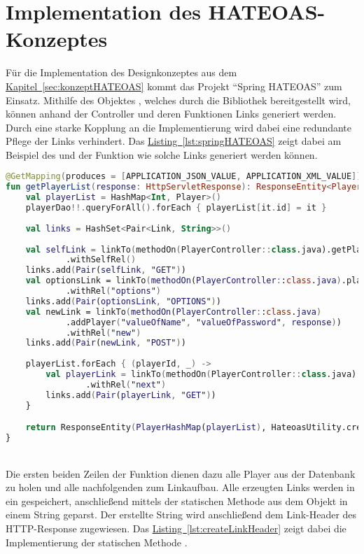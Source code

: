 \section{Implementation des HATEOAS-Konzeptes}
Für die Implementation des Designkonzeptes aus dem \hyperref[sec:konzeptHATEOAS]{Kapitel~\ref{sec:konzeptHATEOAS}} kommt das Projekt \enquote{Spring HATEOAS} zum Einsatz. Mithilfe des Objektes , welches durch die Bibliothek bereitgestellt wird, können anhand der Controller und deren Funktionen Links generiert werden. Durch eine starke Kopplung an die Implementierung wird dabei eine redundante Pflege der Links verhindert. Das \hyperref[lst:springHATEOAS]{Listing~\ref{lst:springHATEOAS}} zeigt dabei am Beispiel des  und der Funktion  wie solche Links generiert werden können.\\
\begin{lstlisting}[style=lstStyleFramed, language=Kotlin, caption={Linkaufbau mithilfe des Projektes \enquote{Spring HATEOAS}}, label=lst:springHATEOAS, float]
@GetMapping(produces = [APPLICATION_JSON_VALUE, APPLICATION_XML_VALUE])
fun getPlayerList(response: HttpServletResponse): ResponseEntity<PlayerHashMap> {
	val playerList = HashMap<Int, Player>()
	playerDao!!.queryForAll().forEach { playerList[it.id] = it }
	
	val links = HashSet<Pair<Link, String>>()
	
	val selfLink = linkTo(methodOn(PlayerController::class.java).getPlayerList(response))
			.withSelfRel()
	links.add(Pair(selfLink, "GET"))
	val optionsLink = linkTo(methodOn(PlayerController::class.java).playerOptions(response))
			.withRel("options")
	links.add(Pair(optionsLink, "OPTIONS"))
	val newLink = linkTo(methodOn(PlayerController::class.java)
			.addPlayer("valueOfName", "valueOfPassword", response))
			.withRel("new")
	links.add(Pair(newLink, "POST"))
	
	playerList.forEach { (playerId, _) ->
		val playerLink = linkTo(methodOn(PlayerController::class.java).getPlayerById(playerId, response))
				.withRel("next")
		links.add(Pair(playerLink, "GET"))
	}

	return ResponseEntity(PlayerHashMap(playerList), HateoasUtility.createLinkHeader(links), OK)
}
\end{lstlisting}
\\
Die ersten beiden Zeilen der Funktion dienen dazu alle Player aus der Datenbank zu holen und alle nachfolgenden zum Linkaufbau. Alle erzeugten Links werden in ein  gespeichert, anschließend mittels der statischen Methode  aus dem Objekt  in einem String geparst. Der erstellte String wird anschließend dem Link-Header des \gls{HTTP}-Response zugewiesen. Das \hyperref[lst:createLinkHeader]{Listing~\ref{lst:createLinkHeader}} zeigt dabei die Implementierung der statischen Methode .\\
